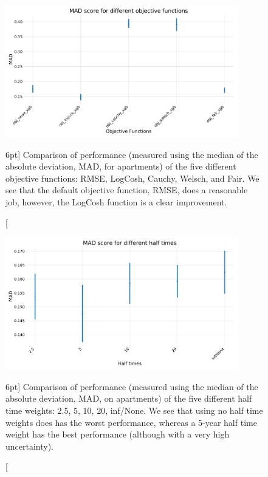 \documentclass[a4paper, twoside]{tufte-book}
\begin{document}
\begin{figure}
  \includegraphics[width=0.9\textwidth, trim=0 35 0 40, clip]{figures/housing/Ejerlejlighed_v17_cut_all_Ncols_all__MAD_gridsearch_obj.pdf}
  \caption[Comparison of different objective functions][6pt]
          {Comparison of performance (measured using the median of the absolute deviation, MAD, for apartments) of the five different objective functions: RMSE, LogCosh, Cauchy, Welsch, and Fair. We see that the default objective function, RMSE, does a reasonable job, however, the LogCosh function is a clear improvement.
          } 
  \label{fig:h:objective_functions_performance}
\end{figure}



\begin{figure}
  \includegraphics[width=0.9\textwidth, trim=0 0 0 40, clip]{figures/housing/Ejerlejlighed_v17_cut_all_Ncols_all__MAD_gridsearch_half.pdf}
  \caption[Comparison of different half times weights][6pt]
          {Comparison of performance (measured using the median of the absolute deviation, MAD, on apartments) of the five different half time weights: 2.5, 5, 10, 20, inf/None. We see that using no half time weights does has the worst performance, whereas a 5-year half time weight has the best performance (although with a very high uncertainty).
          } 
  \label{fig:h:half_time_performance}
\end{figure}
\end{document}
